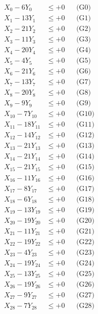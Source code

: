 \documentclass[a4paper,10pt]{article}
\begin{document}
\allowdisplaybreaks
{\small
\begin{align}
\allowbreak
\allowbreak
\allowbreak
X_{0} - 6Y_{0} &\leq +0 && \text{(G0)} \\
X_{1} - 13Y_{1} &\leq +0 && \text{(G1)} \\
X_{2} - 21Y_{2} &\leq +0 && \text{(G2)} \\
X_{3} - 11Y_{3} &\leq +0 && \text{(G3)} \\
X_{4} - 20Y_{4} &\leq +0 && \text{(G4)} \\
X_{5} - 4Y_{5} &\leq +0 && \text{(G5)} \\
X_{6} - 21Y_{6} &\leq +0 && \text{(G6)} \\
X_{7} - 13Y_{7} &\leq +0 && \text{(G7)} \\
\allowbreak
X_{8} - 20Y_{8} &\leq +0 && \text{(G8)} \\
X_{9} - 9Y_{9} &\leq +0 && \text{(G9)} \\
X_{10} - 7Y_{10} &\leq +0 && \text{(G10)} \\
X_{11} - 18Y_{11} &\leq +0 && \text{(G11)} \\
X_{12} - 14Y_{12} &\leq +0 && \text{(G12)} \\
X_{13} - 21Y_{13} &\leq +0 && \text{(G13)} \\
X_{14} - 21Y_{14} &\leq +0 && \text{(G14)} \\
X_{15} - 21Y_{15} &\leq +0 && \text{(G15)} \\
X_{16} - 11Y_{16} &\leq +0 && \text{(G16)} \\
X_{17} - 8Y_{17} &\leq +0 && \text{(G17)} \\
\allowbreak
X_{18} - 6Y_{18} &\leq +0 && \text{(G18)} \\
X_{19} - 13Y_{19} &\leq +0 && \text{(G19)} \\
X_{20} - 19Y_{20} &\leq +0 && \text{(G20)} \\
X_{21} - 11Y_{21} &\leq +0 && \text{(G21)} \\
X_{22} - 19Y_{22} &\leq +0 && \text{(G22)} \\
X_{23} - 4Y_{23} &\leq +0 && \text{(G23)} \\
X_{24} - 19Y_{24} &\leq +0 && \text{(G24)} \\
X_{25} - 13Y_{25} &\leq +0 && \text{(G25)} \\
X_{26} - 19Y_{26} &\leq +0 && \text{(G26)} \\
X_{27} - 9Y_{27} &\leq +0 && \text{(G27)} \\
\allowbreak
X_{28} - 7Y_{28} &\leq +0 && \text{(G28)} \\

\end{align}}
\end{document}
